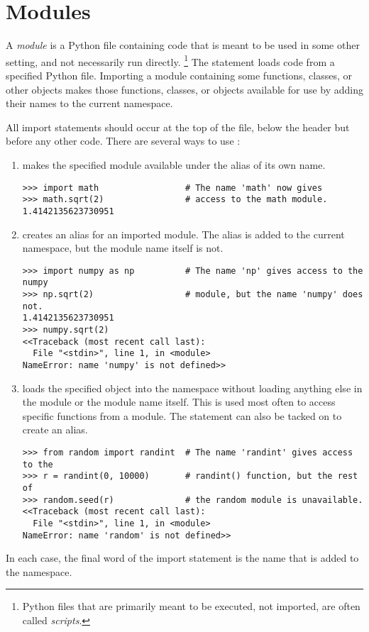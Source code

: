 \section*{Modules} %

A \emph{module} is a Python file containing code that is meant to be used in some other setting, and not necessarily run directly.%
\footnote{Python files that are primarily meant to be executed, not imported, are often called \emph{scripts}.}
The  statement loads code from a specified Python file.
Importing a module containing some functions, classes, or other objects makes those functions, classes, or objects available for use by adding their names to the current namespace.

All import statements should occur at the top of the file, below the header but before any other code.
There are several ways to use :
\begin{enumerate}

\item {} makes the specified module available under the alias of its own name.
\begin{lstlisting}
>>> import math                 # The name 'math' now gives
>>> math.sqrt(2)                # access to the math module.
1.4142135623730951
\end{lstlisting}

\item {} creates an alias for an imported module. The alias is added to the current namespace, but the module name itself is not.

\begin{lstlisting}
>>> import numpy as np          # The name 'np' gives access to the numpy
>>> np.sqrt(2)                  # module, but the name 'numpy' does not.
1.4142135623730951
>>> numpy.sqrt(2)
<<Traceback (most recent call last):
  File "<stdin>", line 1, in <module>
NameError: name 'numpy' is not defined>>
\end{lstlisting}

\item {} loads the specified object into the namespace without loading anything else in the module or the module name itself.
This is used most often to access specific functions from a module.
The  statement can also be tacked on to create an alias.

\begin{lstlisting}
>>> from random import randint  # The name 'randint' gives access to the
>>> r = randint(0, 10000)       # randint() function, but the rest of
>>> random.seed(r)              # the random module is unavailable.
<<Traceback (most recent call last):
  File "<stdin>", line 1, in <module>
NameError: name 'random' is not defined>>
\end{lstlisting}
\end{enumerate}
%
In each case, the final word of the import statement is the name that is added to the namespace.


